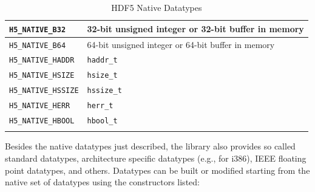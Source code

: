 \documentclass{../../template/esiwace-report}
\begin{document}
\begin{longtable}{|>{\centering\arraybackslash} m{5.5cm} | >{\centering\arraybackslash} m{6cm} |}
        \small \texttt{H5\_NATIVE\_B32}     & \small 32-bit unsigned integer or 32-bit buffer in memory \\ \hline
        \small \texttt{H5\_NATIVE\_B64}     & \small 64-bit unsigned integer or 64-bit buffer in memory \\ \hline
        \small \texttt{H5\_NATIVE\_HADDR}   & \small \texttt{haddr\_t}                                  \\ \hline
        \small \texttt{H5\_NATIVE\_HSIZE}   & \small \texttt{hsize\_t}                                  \\ \hline
        \small \texttt{H5\_NATIVE\_HSSIZE}  & \small \texttt{hssize\_t}                                 \\ \hline
        \small \texttt{H5\_NATIVE\_HERR}    & \small \texttt{herr\_t}                                   \\ \hline
        \small \texttt{H5\_NATIVE\_HBOOL}   & \small \texttt{hbool\_t}                                  \\ \hline
        \caption{HDF5 Native Datatypes}
        \label{table: hdf5-types}
\end{longtable}

Besides the native datatypes just described, the library also provides so called standard datatypes, architecture specific datatypes (e.g., for i386), IEEE floating point datatypes, and others. 
Datatypes can be built or modified starting from the native set of datatypes using the constructors listed:
\end{document}

